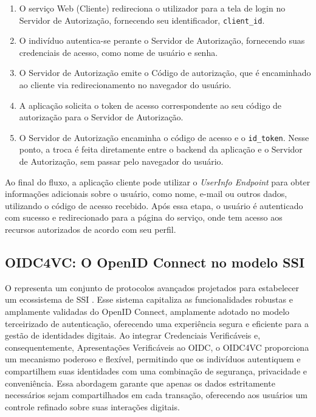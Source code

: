 \begin{enumerate}
    
    \item O serviço Web (Cliente) redireciona o utilizador para a tela de login no Servidor de Autorização, fornecendo seu identificador, \texttt{client\_id}.
    
    \item O indivíduo autentica-se perante o Servidor de Autorização, fornecendo suas credenciais de acesso, como nome de usuário e senha.
    
    \item O Servidor de Autorização emite o Código de autorização, que é encaminhado ao cliente via redirecionamento no navegador do usuário.
    
    \item A aplicação solicita o token de acesso correspondente ao seu código de autorização para o Servidor de Autorização. 
    
    \item O Servidor de Autorização encaminha o código de acesso e o \texttt{id\_token}. Nesse ponto, a troca é feita diretamente entre o backend da aplicação e o Servidor de Autorização, sem passar pelo navegador do usuário.

\end{enumerate}

Ao final do fluxo, a aplicação cliente pode utilizar o \emph{UserInfo Endpoint} para obter informações adicionais sobre o usuário, como nome, e-mail ou outros dados, utilizando o código de acesso recebido. Após essa etapa, o usuário é autenticado com sucesso e redirecionado para a página do serviço, onde tem acesso aos recursos autorizados de acordo com seu perfil.

\subsection{OIDC4VC: O OpenID Connect no modelo SSI }\label{subsec:oidc4vc}

O  representa um conjunto de protocolos avançados projetados para estabelecer um ecossistema de \acs{SSI} \cite{OIDC4VCWhitepaper2022}. Esse sistema capitaliza as funcionalidades robustas e amplamente validadas do OpenID Connect, amplamente adotado no modelo terceirizado de autenticação, oferecendo uma experiência segura e eficiente para a gestão de identidades digitais. Ao integrar Credenciais Verificáveis e, consequentemente, Apresentações Verificáveis ao \acs{OIDC}, o \acs{OIDC4VC} proporciona um mecanismo poderoso e flexível, permitindo que os indivíduos autentiquem e compartilhem suas identidades com uma combinação de segurança, privacidade e conveniência.  Essa abordagem garante que apenas os dados estritamente necessários sejam compartilhados em cada transação, oferecendo aos usuários um controle refinado sobre suas interações digitais.

